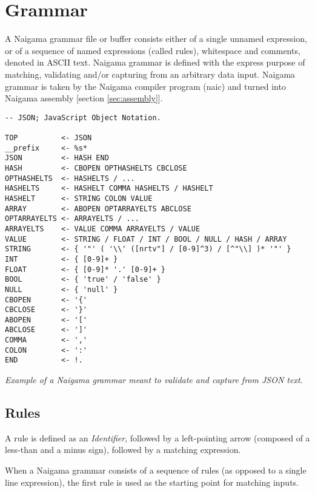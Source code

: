 \section{Grammar}
\label{sec:grammar}

A Naigama grammar file or buffer consists either of a single
unnamed expression, or of a sequence of named expressions (called rules),
whitespace and comments, denoted in ASCII text.
Naigama grammar is defined with the express purpose of matching, validating
and/or capturing from an arbitrary data input.
Naigama grammar is taken by the Naigama compiler program (naic) and turned
into Naigama assembly [section \ref{sec:assembly}].

\begin{myquote}
\begin{verbatim}
-- JSON; JavaScript Object Notation.

TOP          <- JSON
__prefix     <- %s*
JSON         <- HASH END
HASH         <- CBOPEN OPTHASHELTS CBCLOSE
OPTHASHELTS  <- HASHELTS / ...
HASHELTS     <- HASHELT COMMA HASHELTS / HASHELT
HASHELT      <- STRING COLON VALUE
ARRAY        <- ABOPEN OPTARRAYELTS ABCLOSE
OPTARRAYELTS <- ARRAYELTS / ...
ARRAYELTS    <- VALUE COMMA ARRAYELTS / VALUE
VALUE        <- STRING / FLOAT / INT / BOOL / NULL / HASH / ARRAY
STRING       <- { '"' ( '\\' ([nrtv"] / [0-9]^3) / [^"\\] )* '"' }
INT          <- { [0-9]+ }
FLOAT        <- { [0-9]* '.' [0-9]+ }
BOOL         <- { 'true' / 'false' }
NULL         <- { 'null' }
CBOPEN       <- '{'
CBCLOSE      <- '}'
ABOPEN       <- '['
ABCLOSE      <- ']'
COMMA        <- ','
COLON        <- ':'
END          <- !.

\end{verbatim}
\end{myquote}
\textit{Example of a Naigama grammar meant to validate and capture from
JSON\cite{bib:json} text.}

\subsection{Rules}

A rule is defined as an \textit{Identifier}, followed by a
left-pointing arrow (composed of a less-than and a minus sign),
followed by a matching expression.

When a Naigama grammar consists of a sequence of rules
(as opposed to a single line expression),
the first rule is used as the starting point for matching inputs.

